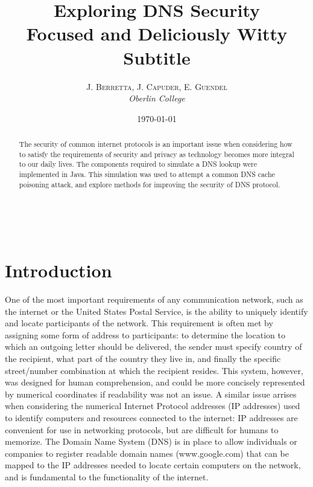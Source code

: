 \documentclass[a4paper, 12pt]{article} %
\title{\textbf{Exploring DNS Security}\\ %
Focused and Deliciously Witty Subtitle} %
\author{\textsc{J. Berretta, J. Capuder, E. Guendel} %
\\{\textit{Oberlin College}}} %
\date{\today} %
\makeatletter
\renewcommand{\maketitle}{ %
\begin{flushright} %
{\LARGE\@title} %

\vspace{30pt} %

{\large\@author} %
\\\@date %

\vspace{30pt} %
\end{flushright}
}
\makeatother
\begin{document}
\maketitle %



\begin{abstract}
The security of common internet protocols is an important issue when considering how to satisfy the requirements of security and privacy as technology becomes more integral to our daily lives. The components required to simulate a DNS lookup were implemented in Java. This simulation was used to attempt a common DNS cache poisoning attack, and explore methods for improving the security of DNS protocol.
\end{abstract}


\vspace{10pt} %


\section*{Introduction}

One of the most important requirements of any communication network, such as the internet or the United States Postal Service, is the ability to uniquely identify and locate participants of the network. This requirement is often met by assigning some form of address to participants: to determine the location to which an outgoing letter should be delivered, the sender must specify country of the recipient, what part of the country they live in, and finally the specific street/number combination at which the recipient resides. This system, however, was designed for human comprehension, and could be more concisely represented by numerical coordinates if readability was not an issue. A similar issue arrises when considering the numerical Internet Protocol addresses (IP addresses) used to identify computers and resources connected to the internet: IP addresses are convenient for use in networking protocols, but are difficult for humans to memorize. The Domain Name System (DNS) is in place to allow individuals or companies to register readable domain names (www.google.com) that can be mapped to the IP addresses needed to locate certain computers on the network, and is fundamental to the functionality of the internet.
\end{document}
